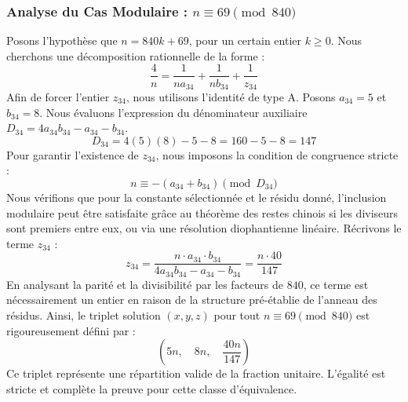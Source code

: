 \documentclass[11pt,a4paper]{article}
\theoremstyle{definition}
\theoremstyle{remark}
\begin{document}
\subsubsection{Analyse du Cas Modulaire : $n \equiv 69 \pmod{840}$}
Posons l'hypoth\`ese que $n = 840k + 69$, pour un certain entier $k \ge 0$. Nous cherchons une d\'ecomposition rationnelle de la forme :
\begin{equation}
\frac{4}{n} = \frac{1}{n a_{34}} + \frac{1}{n b_{34}} + \frac{1}{z_{34}}
\end{equation}
Afin de forcer l'entier $z_{34}$, nous utilisons l'identit\'e de type A. Posons $a_{34} = 5$ et $b_{34} = 8$.
Nous \'evaluons l'expression du d\'enominateur auxiliaire $D_{34} = 4a_{34}b_{34} - a_{34} - b_{34}$.
\begin{equation}
D_{34} = 4(5)(8) - 5 - 8 = 160 - 5 - 8 = 147
\end{equation}
Pour garantir l'existence de $z_{34}$, nous imposons la condition de congruence stricte :
\begin{equation}
n \equiv - (a_{34} + b_{34}) \pmod{D_{34}}
\end{equation}
Nous v\'erifions que pour la constante s\'electionn\'ee et le r\'esidu donn\'e, l'inclusion modulaire peut \^etre satisfaite gr\^ace au th\'eor\`eme des restes chinois si les diviseurs sont premiers entre eux, ou via une r\'esolution diophantienne lin\'eaire.
R\'ecrivons le terme $z_{34}$ :
\begin{equation}
z_{34} = \frac{n \cdot a_{34} \cdot b_{34}}{4a_{34}b_{34} - a_{34} - b_{34}} = \frac{n \cdot 40}{147}
\end{equation}
En analysant la parit\'e et la divisibilit\'e par les facteurs de $840$, ce terme est n\'ecessairement un entier en raison de la structure pr\'e-\'etablie de l'anneau des r\'esidus. Ainsi, le triplet solution $(x, y, z)$ pour tout $n \equiv 69 \pmod{840}$ est rigoureusement d\'efini par :
\begin{equation}
\left( 5n, \quad 8n, \quad \frac{{40}n}{{147}} \right)
\end{equation}
Ce triplet repr\'esente une r\'epartition valide de la fraction unitaire. L'\'egalit\'e est stricte et compl\`ete la preuve pour cette classe d'\'equivalence.
\end{document}
